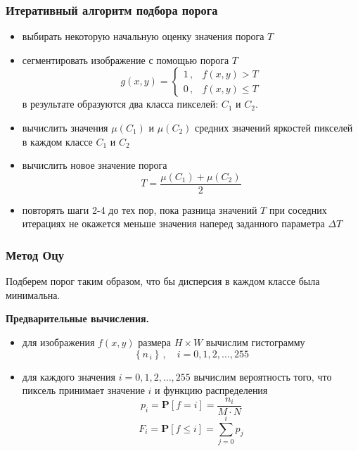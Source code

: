 \documentclass[12pt,usepdftitle=false,aspectratio=1610]{beamer}
\begin{document}
\begin{frame}
\frametitle{Итеративный алгоритм подбора порога}
\begin{itemize}
    \item[1.]<1-> выбирать некоторую начальную оценку значения порога $T$
    \item[2.]<2-> сегментировать изображение с помощью порога $T$
    $$
        g(x, y) =
        \begin{cases}
            1\,, & f(x,y) > T\\
            0\,, & f(x,y) \leq T
        \end{cases}
    $$
    в результате образуются два класса пикселей: $C_1$ и $C_2$.
    \item[3.]<3-> вычислить значения $\mu(C_1)$ и $\mu(C_2)$ средних значений
  яркостей пикселей в каждом классе $C_1$ и $C_2$
    \item[4.]<4-> вычислить новое значение порога
    $$
        T = \frac{\mu(C_1)+\mu(C_2)}{2}
    $$
    \item[5.]<5-> повторять шаги 2-4 до тех пор, пока разница значений $T$
    при соседних итерациях не окажется меньше значения наперед заданного параметра $\Delta T$
\end{itemize}
\end{frame}

\begin{frame}
\frametitle{Метод Оцу}

Подберем порог таким образом, что бы дисперсия в каждом классе была минимальна.

\medskip

\textbf{Предварительные вычисления.}

\begin{itemize}
    \item для изображения $f(x,y)$ размера $H\times W$ вычислим гистограмму
    $$
        \left\{n_{\,i}\right\}\,,\quad i=0,1,2,\ldots,255
    $$
    \item для каждого значения $i=0,1,2,\ldots,255$ вычислим вероятность того,
    что пиксель принимает значение $i$ и функцию распределения
    $$
        p_{i}=\mathbf{P}\left[f = i\right]=\frac{n_{i}}{M\cdot N}
    $$
    $$
        F_i=\mathbf{P}\left[f \leqslant i\right]=\sum_{j=0}^i p_{j}
    $$
\end{itemize}
\end{frame}
\end{document}

